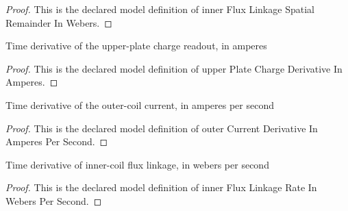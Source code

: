 \begin{proof}
  This is the declared model definition of inner Flux Linkage Spatial Remainder In Webers.
\end{proof}
\begin{definition}
  \label{def:physics:phyx-mini-0978:phyxminiproblems-problemphyxmini0978-upperplatechargederivativeinamperes}
  Time derivative of the upper-plate charge readout, in amperes
\end{definition}
\begin{proof}
  This is the declared model definition of upper Plate Charge Derivative In Amperes.
\end{proof}
\begin{definition}
  \label{def:physics:phyx-mini-0978:phyxminiproblems-problemphyxmini0978-outercurrentderivativeinamperespersecond}
  Time derivative of the outer-coil current, in amperes per second
\end{definition}
\begin{proof}
  This is the declared model definition of outer Current Derivative In Amperes Per Second.
\end{proof}
\begin{definition}
  \label{def:physics:phyx-mini-0978:phyxminiproblems-problemphyxmini0978-innerfluxlinkagerateinweberspersecond}
  Time derivative of inner-coil flux linkage, in webers per second
\end{definition}
\begin{proof}
  This is the declared model definition of inner Flux Linkage Rate In Webers Per Second.
\end{proof}
